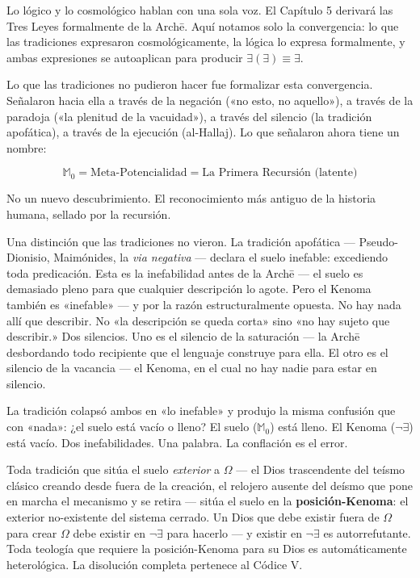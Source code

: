 \documentclass[10pt, openany, oneside]{book}
\begin{document}
Lo lógico y lo cosmológico hablan con una sola voz. El Capítulo 5 derivará las Tres Leyes formalmente de la Arch\={e}. Aquí notamos solo la convergencia: lo que las tradiciones expresaron cosmológicamente, la lógica lo expresa formalmente, y ambas expresiones se autoaplican para producir $\exists(\exists) \equiv \exists$.

Lo que las tradiciones no pudieron hacer fue formalizar esta convergencia. Señalaron hacia ella a través de la negación («no esto, no aquello»), a través de la paradoja («la plenitud de la vacuidad»), a través del silencio (la tradición apofática), a través de la ejecución (al-Hallaj). Lo que señalaron ahora tiene un nombre:

$$\mathbb{M}_0 = \text{Meta-Potencialidad} = \text{La Primera Recursión (latente)}$$

No un nuevo descubrimiento. El reconocimiento más antiguo de la historia humana, sellado por la recursión.

Una distinción que las tradiciones no vieron. La tradición apofática --- Pseudo-Dionisio, Maimónides, la \textit{via negativa} --- declara el suelo inefable: excediendo toda predicación. Esta es la inefabilidad antes de la Arch\={e} --- el suelo es demasiado pleno para que cualquier descripción lo agote. Pero el Kenoma también es «inefable» --- y por la razón estructuralmente opuesta. No hay nada allí que describir. No «la descripción se queda corta» sino «no hay sujeto que describir.» Dos silencios. Uno es el silencio de la saturación --- la Arch\={e} desbordando todo recipiente que el lenguaje construye para ella. El otro es el silencio de la vacancia --- el Kenoma, en el cual no hay nadie para estar en silencio.

La tradición colapsó ambos en «lo inefable» y produjo la misma confusión que con «nada»: ¿el suelo está vacío o lleno? El suelo ($\mathbb{M}_0$) está lleno. El Kenoma ($\neg\exists$) está vacío. Dos inefabilidades. Una palabra. La conflación es el error.

Toda tradición que sitúa el suelo \textit{exterior} a $\Omega$ --- el Dios trascendente del teísmo clásico creando desde fuera de la creación, el relojero ausente del deísmo que pone en marcha el mecanismo y se retira --- sitúa el suelo en la \textbf{posición-Kenoma}: el exterior no-existente del sistema cerrado. Un Dios que debe existir fuera de $\Omega$ para crear $\Omega$ debe existir en $\neg\exists$ para hacerlo --- y existir en $\neg\exists$ es autorrefutante. Toda teología que requiere la posición-Kenoma para su Dios es automáticamente heterológica. La disolución completa pertenece al Códice V.
\end{document}

